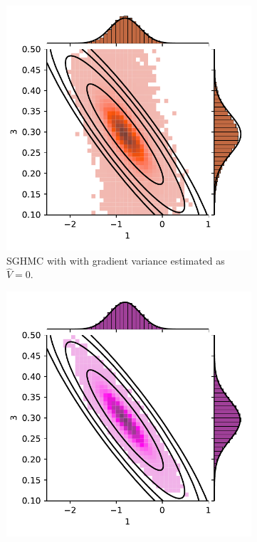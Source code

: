 \begin{figure}[htbp]
    \centering
    \begin{subfigure}[t]{0.4\textwidth}
        \centering
        \includegraphics[width=\textwidth]{Figures/simulated_joint_SGHMC_5.pdf} 
        \caption{SGHMC with with gradient variance estimated as $\hat{V}=0$.}
    \end{subfigure}
    \begin{subfigure}[t]{0.4\textwidth}
        \centering
        \includegraphics[width=\textwidth]{Figures/simulated_joint_SGHMCWithVarianceEstimator_5.pdf} 

\end{subfigure}
\end{figure}
